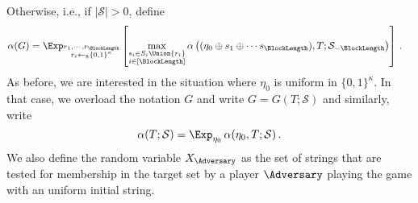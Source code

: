 Otherwise, i.e., if $|\mathcal{S}| > 0$, define
\begin{align*}
    \alpha(G)&=
    \Exp_{\substack{r_1, \cdots, r_\BlockLength \\ r_i \leftarrow_\$ \{0,1\}^\kappa}} \left[ 
        \max_{\substack{s_i \in S_i \Union \{r_i\} \\ i \in [\BlockLength]} } 
        \alpha\left((\eta_0 \oplus s_1 \oplus \cdots s_\BlockLength), T; \mathcal{S}_{-\BlockLength} \right) 
    \right]
    \,.
\end{align*}
As before, we are interested in the situation where 
$\eta_0$ is uniform in $\{0, 1\}^\kappa$. 
In that case, we overload the notation $G$ and write
$G = G(T;\mathcal{S})$ and similarly, write
\[
    \alpha(T;\mathcal{S}) = \Exp_{\eta_0 }\, \alpha(\eta_0, T;\mathcal{S})
    \,.
\]
We also define the random variable $X_\Adversary$ as the set of strings 
that are tested for membership in the target set 
by a player $\Adversary$ playing the game with an uniform initial string.


